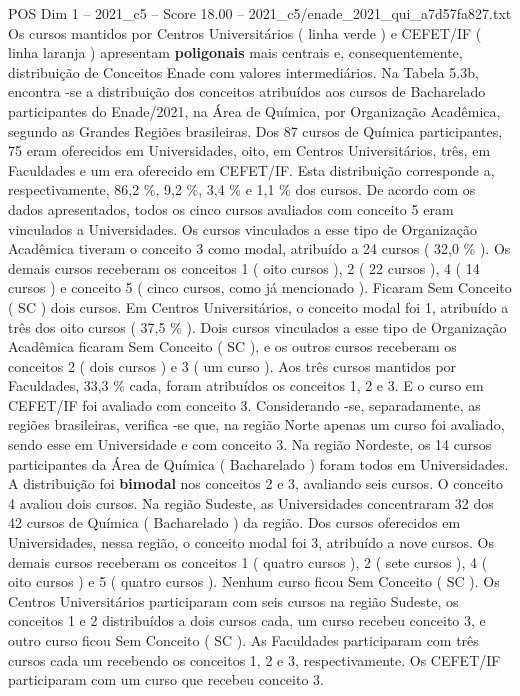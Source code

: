\begin{textsample}{POS Dim 1 – 2021\_c5 – Score 18.00 – 2021\_c5/enade\_2021\_qui\_a7d57fa827.txt}
Os cursos mantidos por Centros Universitários ( linha verde ) e CEFET/IF ( linha laranja ) apresentam \textbf{poligonais} mais centrais e, consequentemente, distribuição de Conceitos Enade com valores intermediários.
Na Tabela 5.3b, encontra -se a distribuição dos conceitos atribuídos aos cursos de Bacharelado participantes do Enade/2021, na Área de Química, por Organização Acadêmica, segundo as Grandes Regiões brasileiras.
Dos 87 cursos de Química participantes, 75 eram oferecidos em Universidades, oito, em Centros Universitários, três, em Faculdades e um era oferecido em CEFET/IF.
Esta distribuição corresponde a, respectivamente, 86,2 \%, 9,2 \%, 3,4 \% e 1,1 \% dos cursos.
De acordo com os dados apresentados, todos os cinco cursos avaliados com conceito 5 eram vinculados a Universidades.
Os cursos vinculados a esse tipo de Organização Acadêmica tiveram o conceito 3 como modal, atribuído a 24 cursos ( 32,0 \% ).
Os demais cursos receberam os conceitos 1 ( oito cursos ), 2 ( 22 cursos ), 4 ( 14 cursos ) e conceito 5 ( cinco cursos, como já mencionado ).
Ficaram Sem Conceito ( SC ) dois cursos.
Em Centros Universitários, o conceito modal foi 1, atribuído a três dos oito cursos ( 37,5 \% ).
Dois cursos vinculados a esse tipo de Organização Acadêmica ficaram Sem Conceito ( SC ), e os outros cursos receberam os conceitos 2 ( dois cursos ) e 3 ( um curso ).
Aos três cursos mantidos por Faculdades, 33,3 \% cada, foram atribuídos os conceitos 1, 2 e 3.
E o curso em CEFET/IF foi avaliado com conceito 3.
Considerando -se, separadamente, as regiões brasileiras, verifica -se que, na região Norte apenas um curso foi avaliado, sendo esse em Universidade e com conceito 3.
Na região Nordeste, os 14 cursos participantes da Área de Química ( Bacharelado ) foram todos em Universidades.
A distribuição foi \textbf{bimodal} nos conceitos 2 e 3, avaliando seis cursos.
O conceito 4 avaliou dois cursos.
Na região Sudeste, as Universidades concentraram 32 dos 42 cursos de Química ( Bacharelado ) da região.
Dos cursos oferecidos em Universidades, nessa região, o conceito modal foi 3, atribuído a nove cursos.
Os demais cursos receberam os conceitos 1 ( quatro cursos ), 2 ( sete cursos ), 4 ( oito cursos ) e 5 ( quatro cursos ).
Nenhum curso ficou Sem Conceito ( SC ).
Os Centros Universitários participaram com seis cursos na região Sudeste, os conceitos 1 e 2 distribuídos a dois cursos cada, um curso recebeu conceito 3, e outro curso ficou Sem Conceito ( SC ).
As Faculdades participaram com três cursos cada um recebendo os conceitos 1, 2 e 3, respectivamente.
Os CEFET/IF participaram com um curso que recebeu conceito 3.

\end{textsample}
